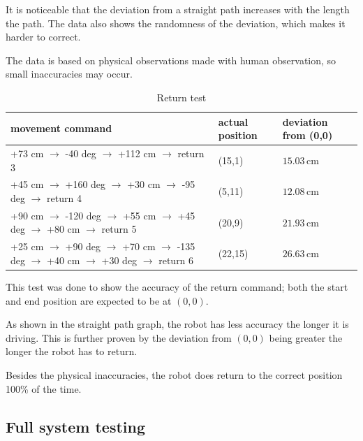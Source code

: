 It is noticeable that the deviation from a straight path increases with the length the path. The data also shows the randomness of the deviation, which makes it harder to correct.

The data is based on physical observations made with human observation, so small inaccuracies may occur.



\begin{table}[H]
    \centering
    \begin{tabular}{l | l l}
        \toprule
        \textbf{movement command} & \textbf{actual position} & \textbf{deviation from (0,0)} \\
        \midrule

    +73 cm $\rightarrow$ -40 deg $\rightarrow$ +112 cm $\rightarrow$ return 3 & (15,1) & $15.03\,\text{cm}$ \\

    +45 cm $\rightarrow$ +160 deg $\rightarrow$ +30 cm $\rightarrow$ -95 deg $\rightarrow$ return 4 & (5,11) & $12.08\,\text{cm}$ \\

    +90 cm $\rightarrow$ -120 deg $\rightarrow$ +55 cm $\rightarrow$ +45 deg $\rightarrow$ +80 cm $\rightarrow$ return 5 & (20,9) & $21.93\,\text{cm}$ \\

    +25 cm $\rightarrow$ +90 deg $\rightarrow$ +70 cm $\rightarrow$ -135 deg $\rightarrow$ +40 cm $\rightarrow$ +30 deg $\rightarrow$ return 6 & (22,15) & $26.63\,\text{cm}$ \\

        \bottomrule
    \end{tabular}
    \caption{Return test}
    \label{tab:return}
\end{table}



This test was done to show the accuracy of the return command; both the start and end position are expected to be at $(0,0)$.

As shown in the straight path graph, the robot has less accuracy the longer it is driving. This is further proven by the deviation from $(0,0)$ being greater the longer the robot has to return.

Besides the physical inaccuracies, the robot does return to the correct position 100\% of the time.


\subsection{Full system testing}


